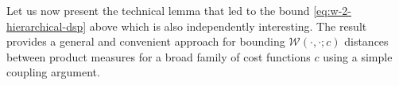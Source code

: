 \documentclass[final]{siamart171218}
\newcommand{\mcl}{\mathcal}
\newcommand{\mX}{\mcl{X}}
\newcommand{\W}{\mathcal{W}}
\newcommand{\Law}{{\rm Law}}
\begin{document}

  


Let us now present the technical lemma that led to the bound \eqref{eq:w-2-hierarchical-dsp} above
which is also independently interesting.
The result provides a general and convenient approach for bounding  
$\W(\cdot, \cdot; c)$ distances between product measures 
for a broad family of cost functions $c$ using a simple coupling argument.
\end{document}
